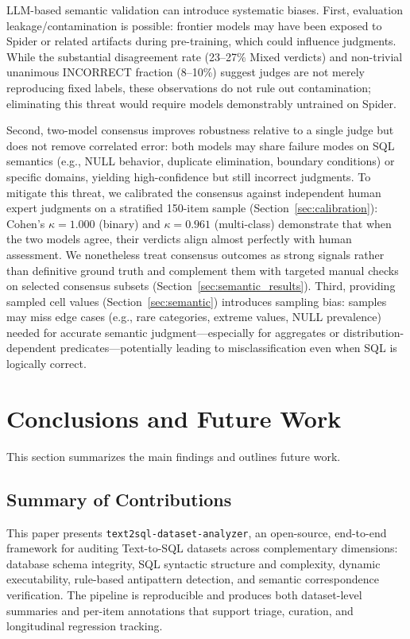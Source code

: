 \documentclass[print]{einformatica}
\begin{document}
LLM-based semantic validation can introduce systematic biases. First, evaluation leakage/contamination is possible: frontier models may have been exposed to Spider or related artifacts during pre-training, which could influence judgments. While the substantial disagreement rate (23--27\% Mixed verdicts) and non-trivial unanimous INCORRECT fraction (8--10\%) suggest judges are not merely reproducing fixed labels, these observations do not rule out contamination; eliminating this threat would require models demonstrably untrained on Spider.

Second, two-model consensus improves robustness relative to a single judge but does not remove correlated error: both models may share failure modes on SQL semantics (e.g., NULL behavior, duplicate elimination, boundary conditions) or specific domains, yielding high-confidence but still incorrect judgments. To mitigate this threat, we calibrated the consensus against independent human expert judgments on a stratified 150-item sample (Section~\ref{sec:calibration}): Cohen's $\kappa = 1.000$ (binary) and $\kappa = 0.961$ (multi-class) demonstrate that when the two models agree, their verdicts align almost perfectly with human assessment. We nonetheless treat consensus outcomes as strong signals rather than definitive ground truth and complement them with targeted manual checks on selected consensus subsets (Section~\ref{sec:semantic_results}). Third, providing sampled cell values (Section~\ref{sec:semantic}) introduces sampling bias: samples may miss edge cases (e.g., rare categories, extreme values, NULL prevalence) needed for accurate semantic judgment---especially for aggregates or distribution-dependent predicates---potentially leading to misclassification even when SQL is logically correct.

\section{Conclusions and Future Work}\label{sec:Conclusions}

This section summarizes the main findings and outlines future work.

\subsection{Summary of Contributions}

This paper presents \texttt{text2sql-dataset-analyzer}, an open-source, end-to-end framework for auditing Text-to-SQL datasets across complementary dimensions: database schema integrity, SQL syntactic structure and complexity, dynamic executability, rule-based antipattern detection, and semantic correspondence verification. The pipeline is reproducible and produces both dataset-level summaries and per-item annotations that support triage, curation, and longitudinal regression tracking.
\end{document}

